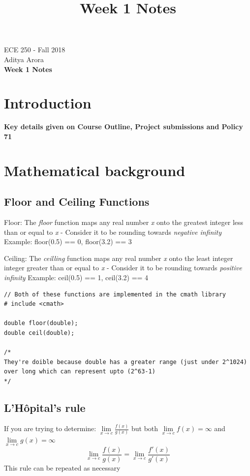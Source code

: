 \documentclass[11pt]{article}
\theoremstyle{definition}
\begin{document}
\title{Week 1 Notes}
\thispagestyle{empty}

\begin{center}
{\vspace{5mm} \LARGE ECE 250 - Fall 2018 \\ \vspace{5mm}Aditya Arora}\\
{\vspace{5mm} \LARGE \bf Week 1 Notes}

\end{center}
\section{Introduction}

\textbf{Key details given on Course Outline, Project submissions and Policy 71}

\section{Mathematical background}
\subsection{Floor and Ceiling Functions}
Floor: The \textit{floor} function maps any real number \textit{x} onto the greatest integer less than or equal to \textit{x} 
\newline
- Consider it to be rounding towards \textit{negative infinity}
Example: floor(0.5) == 0, floor(3.2) == 3

Ceiling: The \textit{ceilling} function maps any real number \textit{x} onto the least integer integer greater than or equal to \textit{x} 
\newline
- Consider it to be rounding towards \textit{positive infinity}
Example: ceil(0.5) == 1, ceil(3.2) == 4
\newline
\begin{lstlisting}
// Both of these functions are implemented in the cmath library
# include <cmath>

double floor(double);
double ceil(double);

/*
They're doible because double has a greater range (just under 2^1024) 
over long which can represent upto (2^63-1)
*/
\end{lstlisting}

\subsection{L’Hôpital’s rule}
If you are trying to determine: $\mathop {\lim }\limits_{x \to c} \frac{{f\left( x \right)}}{{g\left( x \right)}}$
but both $\mathop {\lim }\limits_{x \to c}{f\left( x \right)} = \infty$ and $\mathop {\lim }\limits_{x \to c}{g\left( x \right)} = \infty$
$$\mathop {\lim }\limits_{x \to c} \frac{{f\left( x \right)}}{{g\left( x \right)}} = \mathop {\lim }\limits_{x \to c} \frac{{f'\left( x \right)}}{{g'\left( x \right)}}$$
This rule can be repeated as necessary
\end{document}
